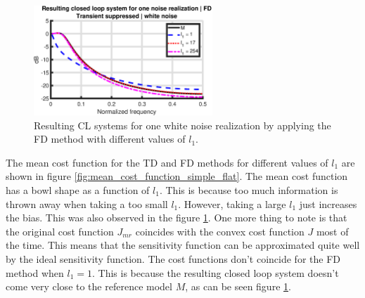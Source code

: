 \begin{figure}[H]
\centering
\includegraphics[width=0.6\textwidth]{figures/CL_FD_simple_flat.eps}
\caption{Resulting CL systems for one white noise realization by applying the FD method with different values of $l_1$.}
\label{fig:CL_FD_simple_flat}
\end{figure}

\newpage
The mean cost function for the TD and FD methods for different values of $l_1$ are shown in figure \ref{fig:mean_cost_function_simple_flat}. The mean cost function has a bowl shape as a function of $l_1$. This is because too much information is thrown away when taking a too small $l_1$. However, taking a large $l_1$ just increases the bias. This was also observed in the figure \ref{fig:CL_FD_simple_flat}. One more thing to note is that the original cost function $J_{mr}$ coincides with the convex cost function $J$ most of the time. This means that the sensitivity function can be approximated quite well by the ideal sensitivity function. The cost functions don't coincide for the FD method when $l_1=1$. This is because the resulting closed loop system doesn't come very close to the reference model $M$, as can be seen figure \ref{fig:CL_FD_simple_flat}.

